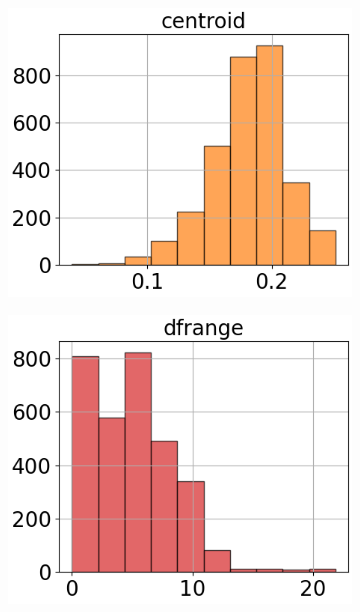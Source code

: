 \begin{figure}[htbp]
    \centering
    \caption{
        Histograms of attributes. 
        Highly correlated (removed) attributes were colored either orange, green or red.
    }
    \label{fig:histograms}
    \begin{subfigure}[t]{.24\textwidth}
        \centering 
        \includegraphics[width=\linewidth]{../../python_code/plots/logistic_regression/histogram-centroid.png}
    \end{subfigure}
    \begin{subfigure}[t]{.24\textwidth}
        \centering 
        \includegraphics[width=\linewidth]{../../python_code/plots/logistic_regression/histogram-dfrange.png}

\end{subfigure}
\end{figure}
